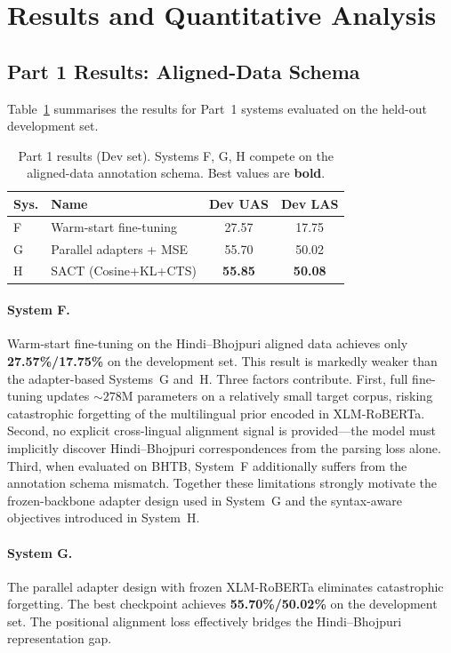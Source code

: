 \documentclass[12pt,a4paper,oneside]{report}
\newcommand{\xlmr}{XLM-RoBERTa}
\begin{document}
\section{Results and Quantitative Analysis}

\subsection{Part 1 Results: Aligned-Data Schema}

Table~\ref{tab:comp1_results} summarises the results for Part~1 systems
evaluated on the held-out development set.

\begin{table}[ht]
\centering
\caption{Part 1 results (Dev set). Systems F, G, H compete on the aligned-data annotation schema. Best values are \textbf{bold}.}
\label{tab:comp1_results}
\begin{tabular}{@{}llcc@{}}
\toprule
\textbf{Sys.} & \textbf{Name} & \textbf{Dev UAS} & \textbf{Dev LAS} \\
\midrule
F & Warm-start fine-tuning      & 27.57 & 17.75 \\
G & Parallel adapters + MSE     & 55.70 & 50.02 \\
H & SACT (Cosine+KL+CTS)       & \textbf{55.85} & \textbf{50.08} \\
\bottomrule
\end{tabular}
\end{table}

\paragraph{System F.}
Warm-start fine-tuning on the Hindi--Bhojpuri aligned data achieves only
\textbf{27.57\%/17.75\%} on the development set. This result is markedly weaker
than the adapter-based Systems~G and~H. Three factors contribute. First, full
fine-tuning updates ${\sim}278$M parameters on a relatively small target corpus,
risking catastrophic forgetting of the multilingual prior encoded in
\xlmr{}. Second, no explicit cross-lingual alignment signal is provided---the model
must implicitly discover Hindi--Bhojpuri correspondences from the parsing loss alone.
Third, when evaluated on BHTB, System~F additionally suffers from the annotation
schema mismatch. Together these limitations strongly motivate the frozen-backbone
adapter design used in System~G and the syntax-aware objectives introduced in
System~H.

\paragraph{System G.}
The parallel adapter design with frozen \xlmr{} eliminates catastrophic forgetting.
The best checkpoint achieves \textbf{55.70\%/50.02\%} on the development set. The
positional alignment loss effectively bridges the Hindi--Bhojpuri representation gap.
\end{document}
